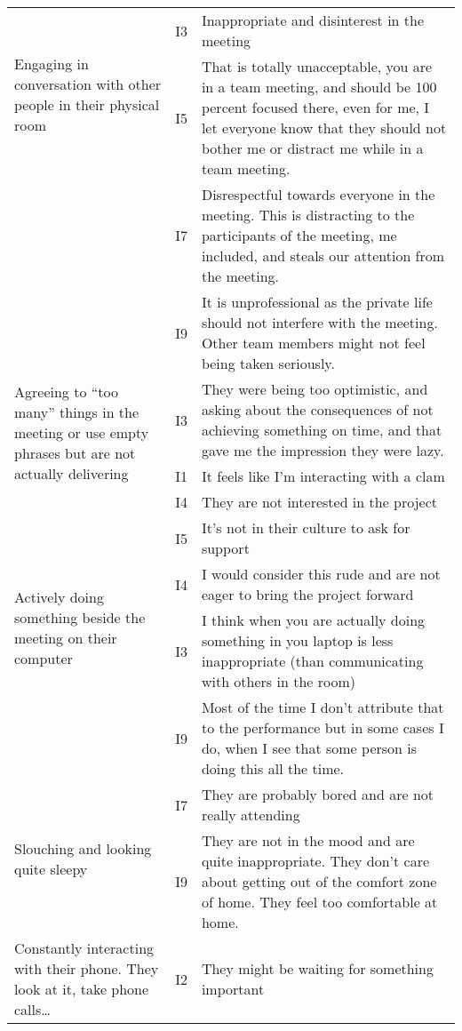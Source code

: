 \begin{longtable}[ht]{ p{}   p{}  p{} }
    \hline
    \multirow{2}{4cm}{Engaging in conversation with other people in their physical room} & I3 & Inappropriate and disinterest in the meeting \\
    & I5 & That is totally unacceptable, you are in a team meeting, and should be 100 percent focused there, even for me, I let everyone know that they should not bother me or distract me while in a team meeting. \\
    & I7 & Disrespectful towards everyone in the meeting. This is distracting to the participants of the meeting, me included, and steals our attention from the meeting.  \\
 	& I9 & It is unprofessional as the private life should not interfere with the meeting. Other team members might not feel being taken seriously.  \\
    \hline
     \multirow{2}{4cm}{Agreeing to “too many” things in the meeting or use empty phrases but are not actually delivering} & I3 & They were being too optimistic, and asking about the consequences of not achieving something on time, and that gave me the impression they were lazy. \\
    & I1 & It feels like I’m interacting with a clam \\
    & I4 & They are not interested in the project  \\
 	& I5 & It’s not in their culture to ask for support \\
    \hline
     \multirow{2}{4cm}{Actively doing something beside the meeting on their computer} & I4 & I would consider this rude and are not eager to bring the project forward \\
    & I3 & I think when you are actually doing something in you laptop is less inappropriate (than communicating with others in the room) \\
 	& I9 & Most of the time I don't attribute that to the performance but in some cases I do, when I see that some person is doing this all the time.\\
    \hline
     \multirow{2}{4cm}{Slouching and looking quite sleepy} & I7 & They are probably bored and are not really attending \\
    & I9 & They are not in the mood and are quite inappropriate. They don’t care about getting out of the comfort zone of home. They feel too comfortable at home. \\
    \hline
    \multirow{2}{4cm}{Constantly interacting with their phone. They look at it, take phone calls…} & I2 & They might be waiting for something important \\

\end{longtable}
